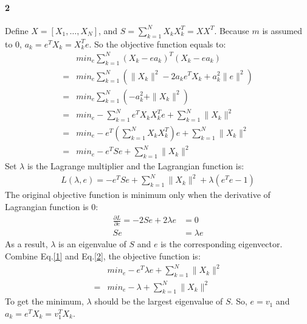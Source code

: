 \documentclass[22pt]{article}
\begin{document}
	\paragraph{2} Define $X = [X_1,\dots,X_N]$, and $S = \sum\limits_{k=1}^{N}X_kX_k^T = XX^T$. Because $m$ is assumed  to $0$, $a_k = e^TX_k = X_k^Te$. So the objective function equals to:
	\begin{align}
		& min_e \sum\limits_{k=1}^{N} (X_k - ea_k)^T(X_k - ea_k)\\
		= & min_e \sum\limits_{k=1}^{N} (\|X_k\|^2 - 2a_ke^TX_k + a_k^2\|e\|^2)\\
		= &  min_e \sum\limits_{k=1}^{N} (-a_k^2 +\|X_k\|^2 ) \\
		= &   min_e - \sum\limits_{k=1}^{N} e^TX_kX_k^Te +  \sum\limits_{k=1}^{N} \|X_k\|^2\\
		= &   min_e - e^T (\sum\limits_{k=1}^{N} X_kX_k^T)e +  \sum\limits_{k=1}^{N} \|X_k\|^2\\
		= &   min_e -  e^TSe +  \sum\limits_{k=1}^{N} \|X_k\|^2 \label{1}
	\end{align}
	Set $\lambda$ is the Lagrange multiplier and the Lagrangian function is:
	\begin{align}
		L(\lambda,e) = -  e^TSe +  \sum\limits_{k=1}^{N} \|X_k\|^2 + \lambda (e^Te - 1)
	\end{align}
	The original objective function is minimum only when the derivative of Lagrangian function is 0:
	\begin{align}
		\frac{\partial L}{\partial e}  = -2Se + 2 \lambda e & = 0\\
		Se & = \lambda e \label{2}
	\end{align}
	As a result, $\lambda$ is an eigenvalue of $S$ and $e$ is the corresponding eigenvector. Combine Eq.\ref{1} and Eq.\ref{2}, the objective function is:
	\begin{align}
		 & min_e -  e^T 	\lambda e +  \sum\limits_{k=1}^{N} \|X_k\|^2 \\
		  = & min_e - \lambda +  \sum\limits_{k=1}^{N} \|X_k\|^2 
	\end{align}
	To get the minimum, $\lambda$ should be the largest eigenvalue of $S$. So, $e = v_1$ and $a_k = e^TX_k = v_1^TX_k$.
\end{document}
